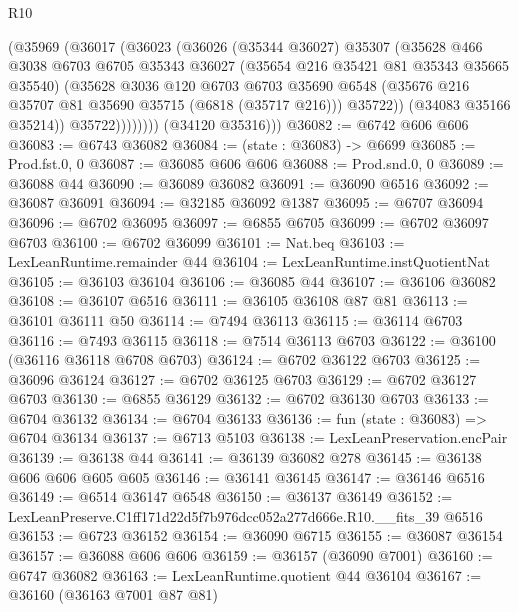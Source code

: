\begin{lexlean}{R10}
\begin{coremodule}
                  (@35969
                    (@36017
                      (@36023
                        (@36026
                          (@35344 @36027)
                          @35307
                          (@35628
                            @466
                            @3038
                            @6703
                            @6705
                            @35343
                            @36027
                            (@35654 @216 @35421 @81 @35343 @35665 @35540)
                            (@35628
                              @3036
                              @120
                              @6703
                              @6703
                              @35690
                              @6548
                              (@35676 @216 @35707 @81 @35690 @35715 (@6818 (@35717 @216)))
                              @35722))
                          (@34083 @35166 @35214))
                        @35722))))))))
        (@34120 @35316)))
@36082 := @6742 @606 @606
@36083 := @6743 @36082
@36084 := (state : @36083) -> @6699
@36085 := Prod.fst.{0, 0}
@36087 := @36085 @606 @606
@36088 := Prod.snd.{0, 0}
@36089 := @36088 @44
@36090 := @36089 @36082
@36091 := @36090 @6516
@36092 := @36087 @36091
@36094 := @32185 @36092 @1387
@36095 := @6707 @36094
@36096 := @6702 @36095
@36097 := @6855 @6705
@36099 := @6702 @36097 @6703
@36100 := @6702 @36099
@36101 := Nat.beq
@36103 := LexLeanRuntime.remainder @44
@36104 := LexLeanRuntime.instQuotientNat
@36105 := @36103 @36104
@36106 := @36085 @44
@36107 := @36106 @36082
@36108 := @36107 @6516
@36111 := @36105 @36108 @87 @81
@36113 := @36101 @36111 @50
@36114 := @7494 @36113
@36115 := @36114 @6703
@36116 := @7493 @36115
@36118 := @7514 @36113 @6703
@36122 := @36100 (@36116 @36118 @6708 @6703)
@36124 := @6702 @36122 @6703
@36125 := @36096 @36124
@36127 := @6702 @36125 @6703
@36129 := @6702 @36127 @6703
@36130 := @6855 @36129
@36132 := @6702 @36130 @6703
@36133 := @6704 @36132
@36134 := @6704 @36133
@36136 := fun (state : @36083) => @6704 @36134
@36137 := @6713 @5103
@36138 := LexLeanPreservation.encPair
@36139 := @36138 @44
@36141 := @36139 @36082 @278
@36145 := @36138 @606 @606 @605 @605
@36146 := @36141 @36145
@36147 := @36146 @6516
@36149 := @6514 @36147 @6548
@36150 := @36137 @36149
@36152 := LexLeanPreserve.C1ff171d22d5f7b976dcc052a277d666e.R10.__fits_39 @6516
@36153 := @6723 @36152
@36154 := @36090 @6715
@36155 := @36087 @36154
@36157 := @36088 @606 @606
@36159 := @36157 (@36090 @7001)
@36160 := @6747 @36082
@36163 := LexLeanRuntime.quotient @44 @36104
@36167 := @36160 (@36163 @7001 @87 @81)

\end{coremodule}
\end{lexlean}
